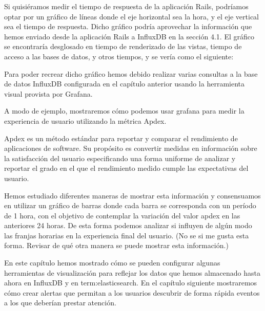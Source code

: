 Si quisiéramos medir el tiempo de respuesta de la aplicación Rails, podríamos optar por un gráfico de líneas donde el eje horizontal sea la hora, y el eje vertical sea el tiempo de respuesta. Dicho gráfico podría aprovechar la información que hemos enviado desde la aplicación Rails a InfluxDB en la sección 4.1. El gráfico se encontraría desglosado en tiempo de renderizado de las vistas, tiempo de acceso a las bases de datos, y otros tiempos, y se vería como el siguiente:


Para poder recrear dicho gráfico hemos debido realizar varias consultas a la base de datos InfluxDB configurada en el capítulo anterior usando la herramienta visual provista por Grafana.


A modo de ejemplo, mostraremos cómo podemos usar grafana para medir la experiencia de usuario utilizando la métrica Apdex.

Apdex es un método estándar para reportar y comparar el rendimiento de aplicaciones de software. Su propósito es convertir medidas en información sobre la satisfacción del usuario especificando una forma uniforme de analizar y reportar el grado en el que el rendimiento medido cumple las expectativas del usuario.


Hemos estudiado diferentes maneras de mostrar esta información y consensuamos en utilizar un gráfico de barras donde cada barra se corresponda con un período de 1 hora, con el objetivo de contemplar la variación del valor apdex en las anteriores 24 horas. De esta forma podemos analizar si influyen de algún modo las franjas horarias en la experiencia final del usuario. (No se si me gusta esta forma. Revisar de qué otra manera se puede mostrar esta información.)



En este capítulo hemos mostrado cómo se pueden configurar algunas herramientas de visualización para reflejar los datos que hemos almacenado hasta ahora en InfluxDB y en \gls{term:elasticsearch}. En el capítulo siguiente mostraremos cómo crear alertas que permitan a los usuarios descubrir de forma rápida eventos a los que deberían prestar atención.
